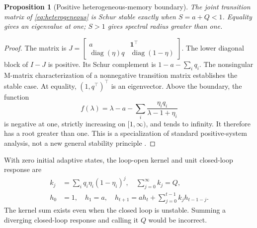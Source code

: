 \documentclass[11pt,a4paper]{article}
\newtheorem{proposition}[theorem]{Proposition}
\theoremstyle{definition}
\theoremstyle{remark}
\begin{document}
\begin{proposition}[Positive heterogeneous-memory boundary]
\label{prop:heterogeneous_boundary}
The joint transition matrix of \eqref{eq:heterogeneous} is Schur stable exactly when $S=a+Q<1$. Equality gives an eigenvalue at one; $S>1$ gives spectral radius greater than one.
\end{proposition}
\begin{proof}
The matrix is $J=\left[\begin{smallmatrix}a&\mathbf1^\top\\\operatorname{diag}(\eta)q&\operatorname{diag}(1-\eta)\end{smallmatrix}\right]$. The lower diagonal block of $I-J$ is positive. Its Schur complement is $1-a-\sum_iq_i$. The nonsingular M-matrix characterization of a nonnegative transition matrix establishes the stable case. At equality, $(1,q^\top)^\top$ is an eigenvector. Above the boundary, the function
\[
 f(\lambda)=\lambda-a-\sum_i\frac{\eta_iq_i}{\lambda-1+\eta_i}
\]
is negative at one, strictly increasing on $[1,\infty)$, and tends to infinity. It therefore has a root greater than one. This is a specialization of standard positive-system analysis, not a new general stability principle \citep{rantzer2015}.
\end{proof}

With zero initial adaptive states, the loop-open kernel and unit closed-loop response are
\begin{align}
 k_j&=\sum_iq_i\eta_i(1-\eta_i)^j,\quad \sum_{j=0}^{\infty}k_j=Q,\label{eq:integrated_kernel}\\
 h_0&=1,\quad h_1=a,\quad
 h_{t+1}=a h_t+\sum_{j=0}^{t-1}k_jh_{t-1-j}.\label{eq:integrated_h}
\end{align}
The kernel sum exists even when the closed loop is unstable. Summing a diverging closed-loop response and calling it $Q$ would be incorrect.
\end{document}
